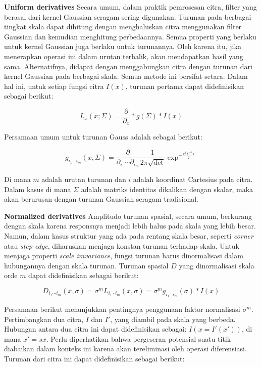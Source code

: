 \textbf{Uniform derivatives} Secara umum, dalam praktik pemrosesan citra, filter yang berasal dari kernel Gaussian seragam sering digunakan. 
Turunan pada berbagai tingkat skala dapat dihitung dengan menghaluskan citra menggunakan filter Gaussian dan kemudian menghitung perbedaannya. 
Semua properti yang berlaku untuk kernel Gaussian juga berlaku untuk turunannya. Oleh karena itu, jika menerapkan operasi ini dalam urutan terbalik, 
akan mendapatkan hasil yang sama. Alternatifnya, didapat dengan menggabungkan citra dengan turunan dari kernel Gaussian pada berbagai skala. 
Semua metode ini bersifat setara. Dalam hal ini, untuk setiap fungsi citra \(I(x)\), turunan pertama dapat didefinisikan sebagai berikut:

\begin{equation*}
  L_{x}(x;\Sigma) = \frac{\partial}{\partial_{x}} * g(\Sigma) * I(x)
\end{equation*}

Persamaan umum untuk turunan Gauss adalah sebagai berikut:

\begin{equation*}
  g_{i_{1}\cdots i_{m}}(x,\Sigma) =\frac{\partial}{\partial_{i_{1}}\cdots \partial_{i_{m}}}\frac{1}{2\pi\sqrt{\det}}\exp^{-\frac{x^{T}\Sigma^{-1}x}{2}}
\end{equation*}

Di mana \(m\) adalah urutan turunan dan \(i\) adalah koordinat Cartesius pada citra. 
Dalam kasus di mana \(\Sigma\) adalah matriks identitas dikalikan dengan skalar, 
maka akan berurusan dengan turunan Gaussian seragam tradisional. 

\textbf{Normalized derivatives} Amplitudo turunan spasial, secara umum, berkurang dengan skala karena responsnya menjadi lebih halus pada skala yang lebih besar. 
Namun, dalam kasus struktur yang ada pada rentang skala besar, seperti \emph{corner} atau \emph{step-edge}, diharuskan menjaga konstan turunan terhadap skala. 
Untuk menjaga properti \emph{scale imvariance}, fungsi turunan harus dinormalisasi dalam hubungannya dengan skala turunan. 
Turunan spasial \(D\) yang dinormalisasi skala orde \(m\) dapat didefinisikan sebagai berikut:

\begin{equation*}
  D_{i_{1}\cdots i_{m}}(x,\sigma) = \sigma^{m}L_{i_{1} \cdot i_{m}}(x,\sigma) = \sigma^{m}g_{i_{1}\cdot i_{m}}(\sigma)*I(x)
\end{equation*}

Persamaan berikut menunjukkan pentingnya penggunaan faktor normalisasi \(\sigma^{m}\). 
Pertimbangkan dua citra, \(I\) dan \(I'\), yang diambil pada skala yang berbeda. 
Hubungan antara dua citra ini dapat didefinisikan sebagai: \(I(x = I'(x'))\), 
di mana \(x' = sx\). Perlu diperhatikan bahwa pergeseran potensial suatu titik diabaikan dalam konteks ini karena akan tereliminasi oleh operasi diferensiasi. 
Turunan dari citra ini dapat didefinisikan sebagai berikut:

